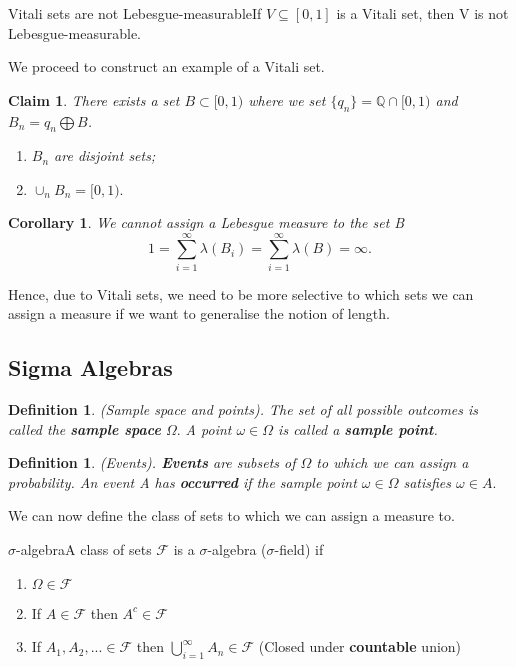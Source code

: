 \documentclass[twoside]{article}
\newtheorem{claim}[theorem]{Claim}
\newtheorem{corollary}[theorem]{Corollary}
\newtheorem{definition}[theorem]{Definition}
\newcommand{\sigmalgebra}{\mathcal{F}}
\begin{document}
\begin{theorem_exam}{Vitali sets are not Lebesgue-measurable}{}If $V \subseteq [0,1]$ is a Vitali set, then V is not Lebesgue-measurable.
\end{theorem_exam}

We proceed to construct an example of a Vitali set.
\begin{claim}There exists a set $B \subset [0,1)$ where we set $\{q_n\} = \mathbb{Q} \cap [0,1)$ and $B_n = q_n \bigoplus B$. 

\begin{enumerate}
\item $B_n$ are disjoint sets;
\item $\cup_n B_n = [0,1).$
\end{enumerate}
\end{claim}

\begin{corollary}We cannot assign a Lebesgue measure to the set B 
$$
1 = \sum_{i=1}^{\infty}\lambda (B_i) = \sum_{i=1}^{\infty}\lambda (B) = \infty.
$$
\end{corollary}

Hence, due to Vitali sets, we need to be more selective to which sets we can assign a measure if we want to generalise the notion of length.

\subsection{Sigma Algebras}

\begin{definition}(Sample space and points).
The set of all possible outcomes is called the \textbf{sample space} $\Omega.$ 
A point $\omega \in \Omega$ is called a \textbf{sample point}.
\end{definition}

\begin{definition}(Events).
\textbf{Events} are subsets of $\Omega$ to which we can assign a probability. An event A has \textbf{occurred} if the sample point $\omega \in \Omega$ satisfies $\omega \in A.$
\end{definition}

We can now define the class of sets to which we can assign a measure to.

\begin{definition_exam}{$\sigma$-algebra}{}A class of sets $\sigmalgebra$ is a $\sigma$-algebra ($\sigma$-field) if 
\begin{enumerate}
\item $\Omega \in \sigmalgebra$
\item If $A \in \sigmalgebra$ then $A^c \in \sigmalgebra$
\item If $A_1,A_2,... \in \sigmalgebra$ then $\bigcup_{i=1}^{\infty}A_n \in \sigmalgebra$ (Closed under \textbf{countable} union)
\end{enumerate}
\end{definition_exam}
\end{document}
